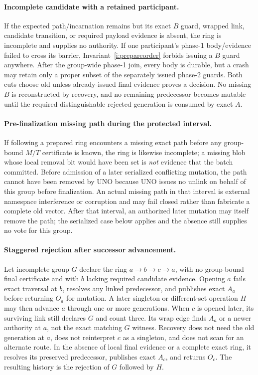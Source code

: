 \documentclass[10pt,twocolumn]{article}
\theoremstyle{remark}
\begin{document}
\paragraph{Incomplete candidate with a retained participant.}
If the expected path/incarnation remains but its exact $B$ guard, wrapped link, candidate transition,
or required payload evidence is absent, the ring is incomplete and supplies no authority. If one
participant's phase-1 body/evidence failed to cross its barrier, Invariant~\ref{i:prepareorder}
forbids issuing a $B$ guard anywhere. After the group-wide phase-1 join, every body is durable, but a
crash may retain only a proper subset of the separately issued phase-2 guards. Both cuts choose old
unless already-issued final evidence proves a decision. No missing $B$ is reconstructed by
recovery, and no remaining predecessor becomes mutable until the required distinguishable rejected
generation is consumed by exact $A$.

\paragraph{Pre-finalization missing path during the protected interval.}
If following a prepared ring encounters a missing exact path before any group-bound $M/T$
certificate is known, the ring is likewise incomplete; a missing blob whose local removal bit would
have been set is \emph{not} evidence that the batch committed. Before admission of a later serialized
conflicting mutation, the path cannot have been removed by UNO because UNO issues no unlink on
behalf of this group before finalization. An actual missing path in that interval is external
namespace interference or corruption and may fail closed rather than fabricate a complete old
vector. After that interval, an authorized later mutation may itself remove the path; the serialized
case below applies and the absence still supplies no vote for this group.

\paragraph{Staggered rejection after successor advancement.}
Let incomplete group $G$ declare the ring $a\to b\to c\to a$, with no group-bound final
certificate and with $b$ lacking required candidate evidence. Opening $a$ fails exact traversal at
$b$, resolves any linked predecessor, and publishes exact $A_a$ before returning $O_a$ for
mutation. A later singleton or different-set operation $H$ may then advance $a$ through one or more
generations. When $c$ is opened later, its surviving link still declares $G$ and count three. Its
wrap edge finds $A_a$ or a newer authority at $a$, not the exact matching $G$ witness. Recovery does
not need the old generation at $a$, does not reinterpret $c$ as a singleton, and does not scan for
an alternate route. In the absence of local final evidence or a complete exact ring, it resolves
its preserved predecessor, publishes exact $A_c$, and returns $O_c$. The resulting history is the
rejection of $G$ followed by $H$.
\end{document}
